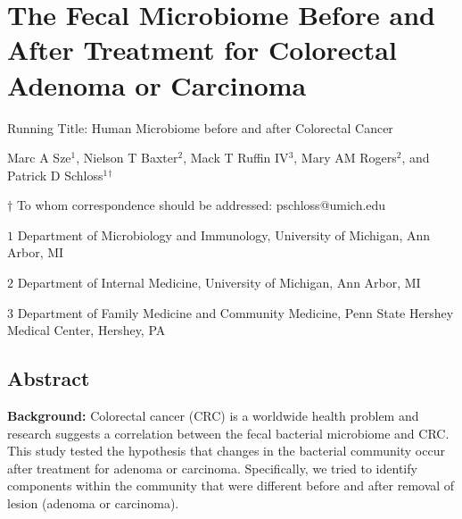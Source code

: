 \documentclass[12pt,]{article}
\title{}
\author{}
\date{}
\begin{document}
\section{The Fecal Microbiome Before and After Treatment for Colorectal
Adenoma or
Carcinoma}\label{the-fecal-microbiome-before-and-after-treatment-for-colorectal-adenoma-or-carcinoma}

\vspace{25mm}

\begin{center}
Running Title: Human Microbiome before and after Colorectal Cancer

\vspace{10mm}

Marc A Sze${^1}$, Nielson T Baxter${^2}$, Mack T Ruffin IV${^3}$, Mary AM Rogers${^2}$, and Patrick D Schloss${^1}$${^\dagger}$

\vspace{20mm}

$\dagger$ To whom correspondence should be addressed: pschloss@umich.edu

$1$ Department of Microbiology and Immunology, University of Michigan, Ann Arbor, MI

$2$ Department of Internal Medicine, University of Michigan, Ann Arbor, MI   

$3$ Department of Family Medicine and Community Medicine, Penn State Hershey Medical Center, Hershey, PA    


\end{center}

\newpage

\linenumbers

\subsection{Abstract}\label{abstract}

\textbf{Background:} Colorectal cancer (CRC) is a worldwide health
problem and research suggests a correlation between the fecal bacterial
microbiome and CRC. This study tested the hypothesis that changes in the
bacterial community occur after treatment for adenoma or carcinoma.
Specifically, we tried to identify components within the community that
were different before and after removal of lesion (adenoma or
carcinoma).
\end{document}
